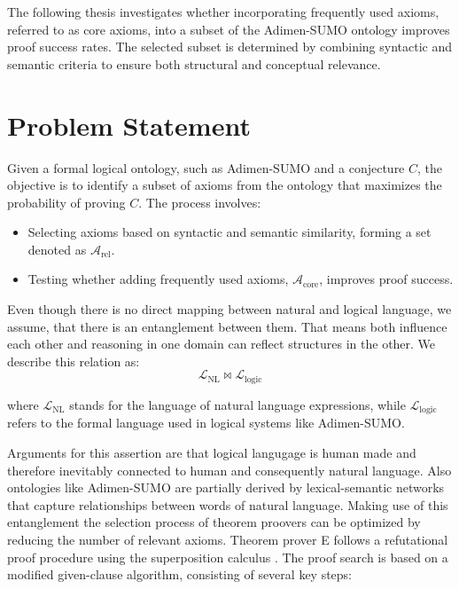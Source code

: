 \documentclass[english,version-2020-11]{uzl-thesis}
\begin{document}
The following thesis investigates whether incorporating frequently used axioms, referred to as core axioms, into a subset of the Adimen-SUMO ontology improves proof success rates. The selected subset is determined by combining syntactic and semantic criteria to ensure both structural and conceptual relevance.

\section{Problem Statement}
Given a formal logical ontology, such as Adimen-SUMO and a conjecture \( C \), the objective is to identify a subset of axioms from the ontology that maximizes the probability of proving \( C \). The process involves:
\begin{itemize}
    \item Selecting axioms based on syntactic and semantic similarity, forming a set denoted as \( \mathcal{A}_{\text{rel}} \).
    \item Testing whether adding frequently used axioms, \( \mathcal{A}_{\text{core}} \), improves proof success.
\end{itemize}

Even though there is no direct mapping between natural and logical language, we assume, that there is an entanglement between them. That means both influence each other and reasoning in one domain can reflect structures in the other. We describe this relation as:\\
\begin{equation}
    \mathcal{L}_{\text{NL}} \bowtie \mathcal{L}_{\text{logic}}
\end{equation}

where \( \mathcal{L}_{\text{NL}} \) stands for the language of natural language expressions, while \( \mathcal{L}_{\text{logic}} \) refers to the formal language used in logical systems like Adimen-SUMO.

Arguments for this assertion are that logical langugage is human made and therefore inevitably connected to human and consequently natural language.
Also ontologies like Adimen-SUMO are partially derived by lexical-semantic networks that capture relationships between words of natural language.
Making use of this entanglement the selection process of theorem proovers can be optimized by reducing the number of relevant axioms.
Theorem prover E follows a refutational proof procedure using the superposition calculus \cite{Schulz2019}. The proof search is based on a modified given-clause algorithm, consisting of several key steps:
\end{document}
